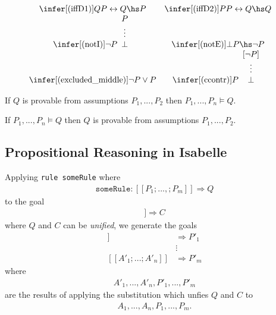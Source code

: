 \documentclass{article}
\begin{document}
\begin{definition}
\begin{align*}
\begin{array}{c c c}
			\infer[(\text{iffD1})]{Q}{P\leftrightarrow Q\hs P}                                                 &
			\infer[(\text{iffD2})]{P}{P\leftrightarrow Q\hs Q}                                                   \\
			\infer[(\text{notI})]{\neg P}{\begin{array}[b]{c}
					P \\ \vdots \\ \bot
				\end{array}}                                          &
			\infer[(\text{notE})]{\bot}{P\hs\neg P}                                                            & \\
			\infer[(\text{excluded\_middle})]{\neg P \vee P}{}                                                 &
			\infer[\text{(ccontr)}]{P}{\begin{array}[b]{c}
					[\neg P] \\ \vdots \\ \bot
				\end{array}}
		\end{array}
	\end{align*}
\end{definition}

\begin{theorem}[Soundness]
	If $Q$ is provable from assumptions $P_1,...,P_2$ then $P_1,...,P_n\vDash Q$.
\end{theorem}
\begin{theorem}[Completeness]
	If $P_1,...,P_n\vDash Q$ then $Q$ is provable from assumptions $P_1,...,P_2$.
\end{theorem}

\subsection{Propositional Reasoning in Isabelle}

\newcommand{\db}[1]{[\![#1]\!]}

\begin{definition}
	Applying \texttt{rule someRule} where
	\begin{align*}
		\texttt{someRule} : \db{P_1;...,;P_m} \Rightarrow Q
	\end{align*}
	to the goal
	\begin{align*}
		\db{A_1; ...; A_n} \Rightarrow C
	\end{align*}
	where $Q$ and $C$ can be \emph{unified}, we generate the goals
	\begin{align*}
		\db{A'_1; ...; A'_n} & \Rightarrow P'_1 \\
		                     & \vdots           \\
		\db{A'_1; ...; A'_n} & \Rightarrow P'_m
	\end{align*}
	where \begin{align*}
		A'_1, ..., A'_n,P'_1,...,P'_m
	\end{align*}
	are the results of applying the
	substitution which unfies $Q$ and $C$ to
	\begin{align*}
		A_1,...,A_n,P_1,...,P_m.
	\end{align*}
\end{definition}
\end{document}
